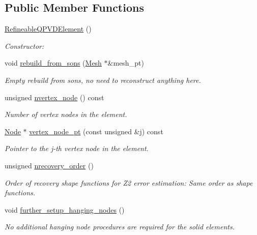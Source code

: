 \subsection*{Public Member Functions}
\begin{DoxyCompactItemize}
\item 
\hyperlink{classoomph_1_1RefineableQPVDElement_a0edf55034c69aa7ae56221ee56f8a76e}{Refineable\+Q\+P\+V\+D\+Element} ()
\begin{DoxyCompactList}\small\item\em Constructor\+: \end{DoxyCompactList}\item 
void \hyperlink{classoomph_1_1RefineableQPVDElement_abf45607aefbc031ce918757010564d26}{rebuild\+\_\+from\+\_\+sons} (\hyperlink{classoomph_1_1Mesh}{Mesh} $\ast$\&mesh\+\_\+pt)
\begin{DoxyCompactList}\small\item\em Empty rebuild from sons, no need to reconstruct anything here. \end{DoxyCompactList}\item 
unsigned \hyperlink{classoomph_1_1RefineableQPVDElement_aa4b6b0cf475e1e26fc26ac8a17ddfac9}{nvertex\+\_\+node} () const
\begin{DoxyCompactList}\small\item\em Number of vertex nodes in the element. \end{DoxyCompactList}\item 
\hyperlink{classoomph_1_1Node}{Node} $\ast$ \hyperlink{classoomph_1_1RefineableQPVDElement_a38b27b036fb60bb46250de484ca54cae}{vertex\+\_\+node\+\_\+pt} (const unsigned \&j) const
\begin{DoxyCompactList}\small\item\em Pointer to the j-\/th vertex node in the element. \end{DoxyCompactList}\item 
unsigned \hyperlink{classoomph_1_1RefineableQPVDElement_ac4d601c414cfba398fc4e6c51c7e9817}{nrecovery\+\_\+order} ()
\begin{DoxyCompactList}\small\item\em Order of recovery shape functions for Z2 error estimation\+: Same order as shape functions. \end{DoxyCompactList}\item 
void \hyperlink{classoomph_1_1RefineableQPVDElement_a6dc2a635636482702ae303b114b1d0a4}{further\+\_\+setup\+\_\+hanging\+\_\+nodes} ()
\begin{DoxyCompactList}\small\item\em No additional hanging node procedures are required for the solid elements. \end{DoxyCompactList}\end{DoxyCompactItemize}
